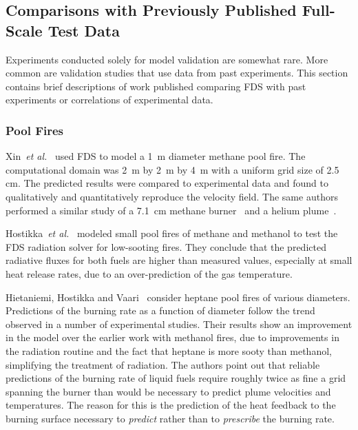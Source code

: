 \subsection{Comparisons with Previously Published Full-Scale Test Data}
\label{prevpub}

Experiments  conducted  solely   for  model  validation  are  somewhat rare.  More common  are validation  studies  that use  data from  past
experiments.  This   section  contains  brief   descriptions  of  work published  comparing  FDS with  past  experiments  or correlations  of
experimental data.

\subsubsection{Pool Fires}


Xin~{\em et  al.}~\cite{Xin:JSS2005} used FDS to model  a 1~m diameter methane pool  fire.  The  computational domain was  2~m by 2~m  by 4~m with  a
uniform  grid  size of  2.5  cm.  The  predicted results  were compared  to   experimental  data  and  found   to  qualitatively  and quantitatively
reproduce   the  velocity  field.   The  same  authors performed a similar study of a 7.1~cm methane burner~\cite{Xin:CF2005} and a helium
plume~\cite{Xin:CS2002}.

Hostikka~{\em  et al.}~\cite{Hostikka:3} modeled  small pool  fires of methane and methanol to test  the FDS radiation solver for low-sooting fires.
They conclude that  the predicted  radiative fluxes  for both fuels  are  higher than  measured  values,  especially  at small  heat release rates,
due to an over-prediction of the gas temperature.

Hietaniemi,  Hostikka and  Vaari~\cite{Hietaniemi:1}  consider heptane pool fires of various diameters.  Predictions of the burning rate as a
function  of  diameter  follow  the  trend observed  in  a  number  of experimental studies.  Their results show an improvement  in the model over
the earlier work with  methanol fires, due to improvements in the radiation  routine  and the  fact  that  heptane  is more  sooty  than methanol,
simplifying  the treatment of radiation.   The authors point out  that reliable  predictions of  the burning  rate of  liquid fuels require roughly
twice as fine a grid spanning the burner than would be necessary to predict plume velocities and temperatures. The reason for this is  the prediction
of the heat  feedback to the  burning surface necessary to {\em predict} rather  than to {\em prescribe} the burning rate.


